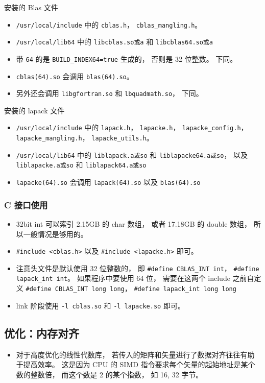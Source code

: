 安装的 Blas 文件
\begin{itemize}
\item \verb`/usr/local/include` 中的 \verb`cblas.h`， \verb`cblas_mangling.h`。
\item \verb`/usr/local/lib64` 中的 \verb`libcblas.so或a` 和 \verb`libcblas64.so或a`
\item 带 \verb`64` 的是 \verb`BUILD_INDEX64=true` 生成的， 否则是 32 位整数。 下同。
\item \verb`cblas(64).so` 会调用 \verb`blas(64).so`。
\item 另外还会调用 \verb`libgfortran.so` 和 \verb`lbquadmath.so`， 下同。
\end{itemize}

安装的 lapack 文件
\begin{itemize}
\item \verb`/usr/local/include` 中的 \verb`lapack.h`， \verb`lapacke.h`， \verb`lapacke_config.h`， \verb`lapacke_mangling.h`， \verb`lapacke_utils.h`。
\item \verb`/usr/local/lib64` 中的 \verb`liblapack.a或so` 和 \verb`liblapacke64.a或so`， 以及 \verb`liblapacke.a或so` 和 \verb`liblapack64.a或so`
\item \verb`lapacke(64).so` 会调用 \verb`lapack(64).so` 以及 \verb`blas(64).so`
\end{itemize}

\subsubsection{C 接口使用}
\begin{itemize}
\item 32bit int 可以索引 2.15GB 的 char 数组， 或者 17.18GB 的 double 数组， 所以一般情况是够用的。
\item \verb`#include <cblas.h>` 以及 \verb`#include <lapacke.h>` 即可。
\item 注意头文件是默认使用 32 位整数的， 即 \verb`#define CBLAS_INT int`， \verb`#define lapack_int int`。 如果程序中要使用 64 位， 需要在这两个 include 之前自定义 \verb`#define CBLAS_INT long long`， \verb`#define lapack_int long long`
\item link 阶段使用 \verb`-l cblas.so` 和 \verb`-l lapacke.so` 即可。
\end{itemize}

\subsection{优化：内存对齐}
\begin{itemize}
\item 对于高度优化的线性代数库， 若传入的矩阵和矢量进行了数据对齐往往有助于提高效率。 这是因为 CPU 的 SIMD 指令要求每个矢量的起始地址是某个数的整数倍， 而这个数是 2 的某个指数， 如 16, 32 字节。
\end{itemize}
